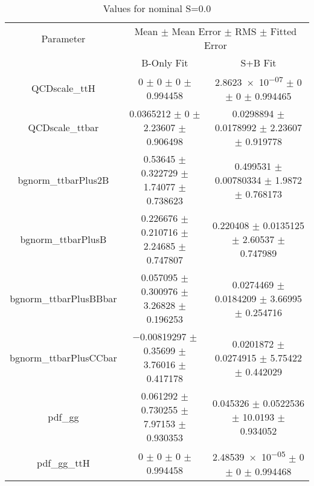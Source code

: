 \begin{table}
\centering
\caption{Values for nominal S=0.0}
\begin{tabular}{ccc}
\toprule
Parameter & \multicolumn{2}{c}{Mean $\pm$ Mean Error $\pm$ RMS $\pm$ Fitted Error}\\
 & B-Only Fit & S+B Fit\\
\midrule
QCDscale\_ttH & \num{0} $\pm$ \num{0} $\pm$ \num{0} $\pm$ \num{0.994458} & \num{2.8623e-07} $\pm$ \num{0} $\pm$ \num{0} $\pm$ \num{0.994465}\\
QCDscale\_ttbar & \num{0.0365212} $\pm$ \num{0} $\pm$ \num{2.23607} $\pm$ \num{0.906498} & \num{0.0298894} $\pm$ \num{0.0178992} $\pm$ \num{2.23607} $\pm$ \num{0.919778}\\
bgnorm\_ttbarPlus2B & \num{0.53645} $\pm$ \num{0.322729} $\pm$ \num{1.74077} $\pm$ \num{0.738623} & \num{0.499531} $\pm$ \num{0.00780334} $\pm$ \num{1.9872} $\pm$ \num{0.768173}\\
bgnorm\_ttbarPlusB & \num{0.226676} $\pm$ \num{0.210716} $\pm$ \num{2.24685} $\pm$ \num{0.747807} & \num{0.220408} $\pm$ \num{0.0135125} $\pm$ \num{2.60537} $\pm$ \num{0.747989}\\
bgnorm\_ttbarPlusBBbar & \num{0.057095} $\pm$ \num{0.300976} $\pm$ \num{3.26828} $\pm$ \num{0.196253} & \num{0.0274469} $\pm$ \num{0.0184209} $\pm$ \num{3.66995} $\pm$ \num{0.254716}\\
bgnorm\_ttbarPlusCCbar & \num{-0.00819297} $\pm$ \num{0.35699} $\pm$ \num{3.76016} $\pm$ \num{0.417178} & \num{0.0201872} $\pm$ \num{0.0274915} $\pm$ \num{5.75422} $\pm$ \num{0.442029}\\
pdf\_gg & \num{0.061292} $\pm$ \num{0.730255} $\pm$ \num{7.97153} $\pm$ \num{0.930353} & \num{0.045326} $\pm$ \num{0.0522536} $\pm$ \num{10.0193} $\pm$ \num{0.934052}\\
pdf\_gg\_ttH & \num{0} $\pm$ \num{0} $\pm$ \num{0} $\pm$ \num{0.994458} & \num{2.48539e-05} $\pm$ \num{0} $\pm$ \num{0} $\pm$ \num{0.994468}\\
\bottomrule
\end{tabular}
\end{table}